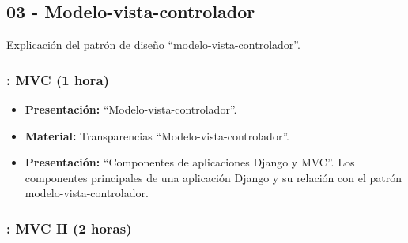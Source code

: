 \documentclass[a4paper,12pt]{article}
\begin{document}
\subsection{03 - Modelo-vista-controlador}

Explicación del patrón de diseño ``modelo-vista-controlador''.

\subsubsection{\martesG: MVC (1 hora)}
\label{cal:martesG}

\begin{itemize}
\item \textbf{Presentación:} ``Modelo-vista-controlador''.
\item \textbf{Material:} Transparencias ``Modelo-vista-controlador''.
\item \textbf{Presentación:} ``Componentes de aplicaciones Django y MVC''.
Los componentes principales de una aplicación Django y su relación con el patrón modelo-vista-controlador.

\end{itemize}

\subsubsection{\martesH: MVC II (2 horas)}
\label{cal:martesH}

\end{document}
